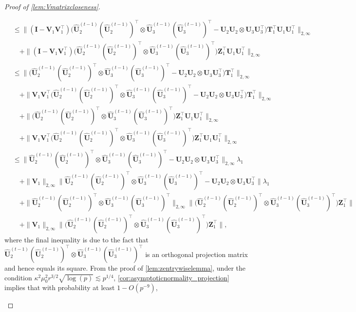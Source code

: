 \documentclass[10pt]{article}
\newcommand{\0}{{\mathbf{0}}}
\newcommand{\1}{{\mathbf{1}}}
\newcommand{\U}{{\mathbf{U}}}
\renewcommand{\t}{^{\top}}
\newcommand{\uhat}{\mathbf{\hat{U}}}
\renewcommand{\hat}{\widehat}
\renewcommand{\hat}{\widehat}
\begin{document}
\begin{proof}[Proof of \cref{lem:Vmatrixcloseness}]
\begin{itemize}
\begin{align*}
    &\leq \|  ( \mathbf{I} - \mathbf{V}_1 \mathbf{V}_1\t )  \bigg( \uhat_2^{(t-1)} (\uhat_2^{(t-1)})\t \otimes \uhat_3^{(t-1)}( \uhat_3^{(t-1)})\t - \U_2 \U_2\otimes \U_3 \U_3\t \bigg) \mathbf{T}_1\t  \U_1 \U_1\t \|_{2,\infty} \\
    &\quad + \|  ( \mathbf{I} - \mathbf{V}_1 \mathbf{V}_1\t )\bigg(\uhat_2^{(t-1)} (\uhat_2^{(t-1)})\t \otimes \uhat_3^{(t-1)}( \uhat_3^{(t-1)})\t\bigg) \mathbf{Z}_1\t  \U_1 \U_1\t \|_{2,\infty} \\
    &\leq \|    \bigg( \uhat_2^{(t-1)} (\uhat_2^{(t-1)})\t \otimes \uhat_3^{(t-1)}( \uhat_3^{(t-1)})\t- \U_2 \U_2\otimes \U_3 \U_3\t \bigg) \mathbf{T}_1\t   \|_{2,\infty} \\
    &\quad +\|  \mathbf{V}_1 \mathbf{V}_1\t \bigg( \uhat_2^{(t-1)} (\uhat_2^{(t-1)})\t \otimes \uhat_3^{(t-1)}( \uhat_3^{(t-1)})\t - \U_2 \U_2\otimes \U_3 \U_3\t \bigg) \mathbf{T}_1\t  \|_{2,\infty} \\
    &\quad + \|   \bigg(\uhat_2^{(t-1)} (\uhat_2^{(t-1)})\t \otimes \uhat_3^{(t-1)}( \uhat_3^{(t-1)})\t\bigg) \mathbf{Z}_1\t  \U_1 \U_1\t \|_{2,\infty} \\
     &\quad + \|   \mathbf{V}_1 \mathbf{V}_1\t \bigg( \uhat_2^{(t-1)} (\uhat_2^{(t-1)})\t \otimes \uhat_3^{(t-1)}( \uhat_3^{(t-1)})\t\bigg) \mathbf{Z}_1\t \U_1 \U_1\t \|_{2,\infty} \\
     &\leq \|  \uhat_2^{(t-1)} (\uhat_2^{(t-1)})\t \otimes \uhat_3^{(t-1)}( \uhat_3^{(t-1)})\t- \U_2 \U_2\otimes \U_3 \U_3\t \|_{2,\infty} \lambda_1 \\
     &\quad + \| \mathbf{V}_1 \|_{2,\infty} \| \uhat_2^{(t-1)} (\uhat_2^{(t-1)})\t \otimes \uhat_3^{(t-1)}( \uhat_3^{(t-1)})\t- \U_2 \U_2\otimes \U_3 \U_3\t \| \lambda_1 \\
     &\quad + \| \uhat_2^{(t-1)} (\uhat_2^{(t-1)})\t \otimes \uhat_3^{(t-1)}( \uhat_3^{(t-1)})\t\|_{2,\infty} \| \bigg( \uhat_2^{(t-1)} (\uhat_2^{(t-1)})\t \otimes \uhat_3^{(t-1)}( \uhat_3^{(t-1)})\t \bigg) \mathbf{Z}_1\t \| \\
     &\quad + \| \mathbf{V}_1 \|_{2,\infty} \| \bigg( \uhat_2^{(t-1)} (\uhat_2^{(t-1)})\t \otimes \uhat_3^{(t-1)}( \uhat_3^{(t-1)})\t \bigg) \mathbf{Z}_1\t \|,
\end{align*}
where the final inequality is due to the fact that $\uhat_2^{(t-1)} (\uhat_2^{(t-1)})\t \otimes \uhat_3^{(t-1)}( \uhat_3^{(t-1)})\t$ is an orthogonal projection matrix  and hence equals its square. 
From the proof of \cref{lem:zentrywiselemma}, under the condition $\kappa^2 \mu_0^2 r^{3/2} \sqrt{\log(p)} \lesssim p^{1/4}$, \cref{cor:asymptoticnormality_projection} implies that with probability at least $1 - O(p^{-9})$,

\end{itemize}
\end{proof}
\end{document}
